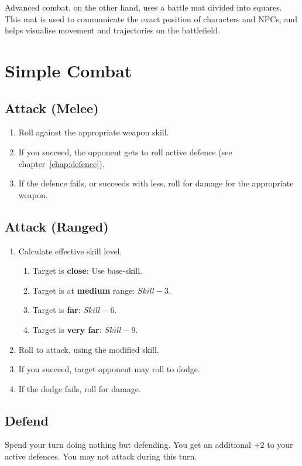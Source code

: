 Advanced combat, on the other hand, uses a battle mat divided into squares. This mat is used to communicate the exact position of characters and NPCs, and helps visualise movement and trajectories on the battlefield.

\newpage
\section{Simple Combat}

\subsection{Attack (Melee)}
\begin{enumerate}
    \item Roll against the appropriate weapon skill.
    \item If you succeed, the opponent gets to roll active defence (see chapter~\ref{chap:defence}).
    \item If the defence fails, or succeeds with less, roll for damage for the appropriate weapon.
\end{enumerate}

\subsection{Attack (Ranged)}
\begin{enumerate}
    \item Calculate effective skill level.
        \begin{enumerate}
            \item Target is \textbf{close}: Use base-skill.
            \item Target is at \textbf{medium} range: $Skill-3$.
            \item Target is \textbf{far}: $Skill-6$.
            \item Target is \textbf{very far}: $Skill-9$.
        \end{enumerate}
    \item Roll to attack, using the modified skill.
    \item If you succeed, target opponent may roll to dodge.
    \item If the dodge fails, roll for damage.
\end{enumerate}

\subsection{Defend}
Spend your turn doing nothing but defending. 
You get an additional $+2$ to your active defences. 
You may not attack during this turn.

